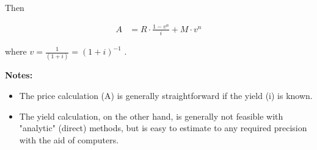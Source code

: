 \documentclass[12pt]{article}
\begin{document}
\begin{flushleft}
    Then
\end{flushleft}
\vspace{-.1in}

\begin{align*}
    A & = R \cdot \frac{1 - v^n}{i} + M \cdot v^n
\end{align*}


\begin{flushleft}
    where {\large $ v = \frac{1}{(1+i)} = (1+i)^{-1} $ }.
\end{flushleft}
\vspace{.2in}





\begin{flushleft}
    \textbf{Notes:} \\
\end{flushleft}

\begin{itemize}
    \item The price calculation (A) is generally straightforward if the yield (i) is known.
    \item The yield calculation, on the other hand, is generally not feasible with "analytic" (direct)
    methods, but is easy to estimate to any required precision with the aid of computers.
\end{itemize}
\end{document}
